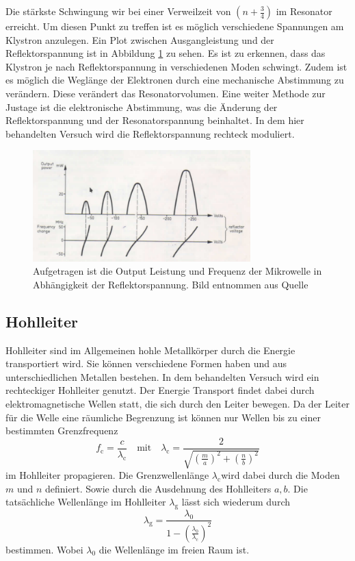 Die stärkste Schwingung wir bei einer Verweilzeit von $(n + \frac{3}{4})$ im Resonator erreicht.
Um diesen Punkt zu treffen ist es möglich verschiedene Spannungen am Klystron anzulegen.
Ein Plot zwischen Ausgangleistung und der Reflektorspannung ist in Abbildung \ref{fig:output_refelktor_voltage} zu sehen.
Es ist zu erkennen, dass das Klystron je nach Reflektorspannung in verschiedenen Moden schwingt.
Zudem ist es möglich die Weglänge der Elektronen durch eine mechanische Abstimmung zu verändern.
Diese verändert das Resonatorvolumen.
Eine weiter Methode zur Justage ist die elektronische Abstimmung, was die Änderung der Reflektorspannung und der Resonatorspannung beinhaltet.
In dem hier behandelten Versuch wird die Reflektorspannung rechteck moduliert.

\begin{figure}
    \centering
    \includegraphics[width=0.75\textwidth]{content/data/refelx_spannung_schema.png}
    \caption{Aufgetragen ist die Output Leistung und Frequenz der Mikrowelle in Abhängigkeit der Reflektorspannung. Bild entnommen aus Quelle \cite[6]{Anleitung}}
    \label{fig:output_refelktor_voltage}
\end{figure}
\FloatBarrier
\subsection{Hohlleiter}
Hohlleiter sind im Allgemeinen hohle Metallkörper durch die Energie transportiert wird.
Sie können verschiedene Formen haben und aus unterschiedlichen Metallen bestehen.
In dem behandelten Versuch wird ein rechteckiger Hohlleiter genutzt.
Der Energie Transport findet dabei durch elektromagnetische Wellen statt, die sich durch den Leiter bewegen.
Da der Leiter für die Welle eine räumliche Begrenzung ist können nur Wellen bis zu einer bestimmten Grenzfrequenz
\begin{equation}
    f_\text{c} = \frac{c}{\lambda _\text{c}} \quad \text{mit} \quad \lambda _\text{c} = \frac{2}{\sqrt{ \left ( \frac{m}{a} \right )^2 + \left ( \frac{n}{b} \right )^2}}
    \label{eq:grenzwellenlaenge}
\end{equation}
im Hohlleiter propagieren.
Die Grenzwellenlänge $\lambda _\text{c} $wird dabei durch die Moden $m$ und $n$ definiert. Sowie durch die Ausdehnung des Hohlleiters $a, b$.
Die tatsächliche Wellenlänge im Hohlleiter $\lambda _\text{g}$ lässt sich wiederum durch 
\begin{equation}
    \lambda _\text{g} = \frac{\lambda _{0}}{1 - \left ( \frac{\lambda _0}{\lambda _\text{c}} \right )^2}
    \label{eq:wellenlaenge_hohleiter}
\end{equation}
bestimmen.
Wobei $\lambda _0$ die Wellenlänge im freien Raum ist.

